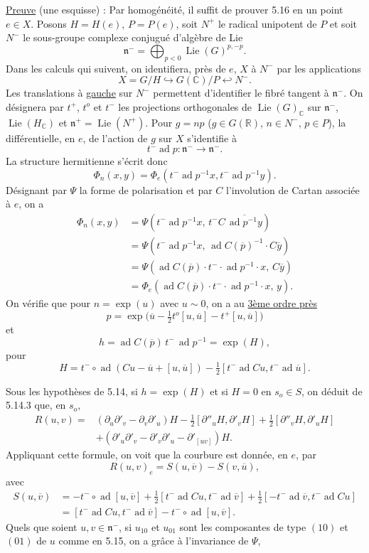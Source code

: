 \documentclass[10pt,leqno]{article}
\newcommand{\C}{\mathbb C}
\newcommand{\R}{\mathbb R}
\theoremstyle{deligne}
\newcommand{\Lie}{\operatorname{Lie}}
\newcommand{\ad}{\operatorname{ad}}
\renewcommand{\underline}[1]{\uline{#1}}
\begin{document}
\underline{Preuve} (une esquisse) : Par homogénéité, il suffit de prouver 5.16 en un point $e\in X$. Posons $H=H(e)$, $P=P(e)$, soit $N^+$ le radical unipotent de $P$ et soit $N^-$ le sous-groupe complexe conjugué d'algèbre de Lie
\[
  \mathfrak n^-=\bigoplus_{p<0}\Lie(G)^{p,-p}.
\]
Dans les calculs qui suivent, on identifiera, près de $e$, $X$ à $N^-$ par les applications
\[
  X=G/H \hookrightarrow G(\C)/P \hookleftarrow N^-.
\]
Les translations à \underline{gauche} sur $N^-$ permettent d'identifier le fibré tangent à $\mathfrak n^-$. On désignera par $t^+$, $t^o$ et $t^-$ les projections orthogonales de $\Lie(G)_\C$ sur $\mathfrak n^-$, $\Lie(H_\C)$ et $\mathfrak n^+=\Lie(N^+)$. Pour $g=np$ ($g\in G(\R)$, $n\in N^-$, $p\in P$), la différentielle, en $e$, de l'action de $g$ sur $X$ s'identifie à
\[
  t^-\ad p:\mathfrak n^-\longrightarrow \mathfrak n^-.
\]
La structure hermitienne s'écrit donc
\[
  \Phi_n(x,y)=\Phi_e(t^-\ad p^{-1}x,t^-\ad p^{-1}y).
\]
Désignant par $\Psi$ la forme de polarisation et par $C$ l'involution de Cartan associée à $e$, on a
\[
\begin{aligned}
 \Phi_n(x,y)
 &=\Psi(t^-\ad p^{-1}x,\,t^- C\,\overline{\ad p^{-1}y})\\
 &=\Psi(t^-\ad p^{-1}x,\,\ad C(\overline p)^{-1}\cdot C\overline y)\\
 &=\Psi(\ad C(\overline p)\cdot t^-\cdot\ad p^{-1}\cdot x,\,C\overline y)\\
 &=\Phi_e(\ad C(\overline p)\cdot t^-\cdot\ad p^{-1}\cdot x,\,y).
\end{aligned}
\]
On vérifie que pour $n=\exp(u)$ avec $u\sim0$, on a au \underline{3ème ordre près}
\[
  p=\exp\bigl(\overline u-\tfrac12t^o[u,\overline u]-t^+[u,\overline u]\bigr)
\]
et
\[
  h=\ad C(\overline p)\,t^-\,\ad p^{-1}=\exp(H),
\]
pour
\[
  H=t^-\circ\ad(Cu-\overline u+[u,\overline u])
  -\tfrac12[t^-\ad Cu,t^-\ad\overline u].
\]

Sous les hypothèses de 5.14, si $h=\exp(H)$ et si $H=0$ en $s_o\in S$, on déduit de 5.14.3 que, en $s_o$,
\[
\begin{aligned}
R(u,v)
={}&(\partial_u\partial'_v-\partial_v\partial'_u)H
-\tfrac12[\partial''_uH,\partial'_vH]
+\tfrac12[\partial''_vH,\partial'_uH]\\
&+(\partial'_u\partial'_v-\partial'_v\partial'_u-\partial'_{[uv]})H .
\end{aligned}
\]
Appliquant cette formule, on voit que la courbure est donnée, en $e$, par
\[
  R(u,v)_e=S(u,\overline v)-S(v,\overline u),
\]
avec
\[
\begin{aligned}
S(u,\overline v)
&=-t^-\circ\ad[u,\overline v]
+\tfrac12[t^-\ad Cu,t^-\ad\overline v]
+\tfrac12[-t^-\ad\overline v,t^-\ad Cu]\\
&=[t^-\ad Cu,t^-\ad\overline v]
-t^-\circ\ad[u,\overline v].
\end{aligned}
\]
Quels que soient $u,v\in\mathfrak n^-$, si $u_{10}$ et $u_{01}$ sont les composantes de type $(10)$ et $(01)$ de $u$ comme en 5.15, on a grâce à l'invariance de $\Psi$,
\end{document}
